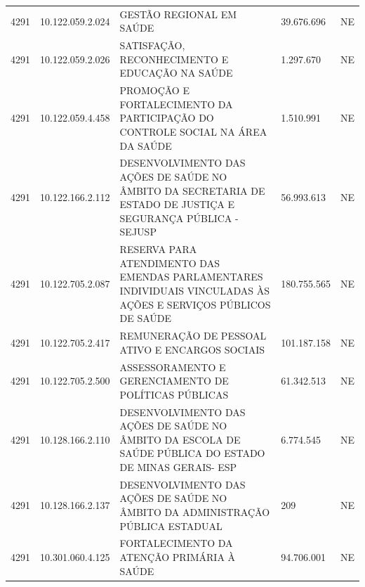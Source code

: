 \documentclass{article}
\begin{document}
\begin{longtable}[c]{m{1cm}|m{2cm}|m{10cm}|m{2cm}|m{1cm}}
\multicolumn{1}{C{1cm}|}{4291} & \multicolumn{1}{C{2cm}|}{10.122.059.2.024} & \multicolumn{1}{L{10cm}|}{GESTÃO REGIONAL EM SAÚDE} & \multicolumn{1}{R{2cm}|}{39.676.696} & \multicolumn{1}{C{1cm}}{NE} \\
\multicolumn{1}{C{1cm}|}{4291} & \multicolumn{1}{C{2cm}|}{10.122.059.2.026} & \multicolumn{1}{L{10cm}|}{SATISFAÇÃO, RECONHECIMENTO E EDUCAÇÃO NA SAÚDE} & \multicolumn{1}{R{2cm}|}{1.297.670} & \multicolumn{1}{C{1cm}}{NE} \\
\multicolumn{1}{C{1cm}|}{4291} & \multicolumn{1}{C{2cm}|}{10.122.059.4.458} & \multicolumn{1}{L{10cm}|}{PROMOÇÃO E FORTALECIMENTO DA PARTICIPAÇÃO DO CONTROLE SOCIAL NA ÁREA DA SAÚDE} & \multicolumn{1}{R{2cm}|}{1.510.991} & \multicolumn{1}{C{1cm}}{NE} \\
\multicolumn{1}{C{1cm}|}{4291} & \multicolumn{1}{C{2cm}|}{10.122.166.2.112} & \multicolumn{1}{L{10cm}|}{DESENVOLVIMENTO DAS AÇÕES DE SAÚDE NO ÂMBITO DA SECRETARIA DE ESTADO DE JUSTIÇA E SEGURANÇA PÚBLICA - SEJUSP} & \multicolumn{1}{R{2cm}|}{56.993.613} & \multicolumn{1}{C{1cm}}{NE} \\
\multicolumn{1}{C{1cm}|}{4291} & \multicolumn{1}{C{2cm}|}{10.122.705.2.087} & \multicolumn{1}{L{10cm}|}{RESERVA PARA ATENDIMENTO DAS EMENDAS PARLAMENTARES INDIVIDUAIS VINCULADAS ÀS AÇÕES E SERVIÇOS PÚBLICOS DE SAÚDE} & \multicolumn{1}{R{2cm}|}{180.755.565} & \multicolumn{1}{C{1cm}}{NE} \\
\multicolumn{1}{C{1cm}|}{4291} & \multicolumn{1}{C{2cm}|}{10.122.705.2.417} & \multicolumn{1}{L{10cm}|}{REMUNERAÇÃO DE PESSOAL ATIVO E ENCARGOS SOCIAIS} & \multicolumn{1}{R{2cm}|}{101.187.158} & \multicolumn{1}{C{1cm}}{NE} \\
\multicolumn{1}{C{1cm}|}{4291} & \multicolumn{1}{C{2cm}|}{10.122.705.2.500} & \multicolumn{1}{L{10cm}|}{ASSESSORAMENTO E GERENCIAMENTO DE POLÍTICAS PÚBLICAS} & \multicolumn{1}{R{2cm}|}{61.342.513} & \multicolumn{1}{C{1cm}}{NE} \\
\multicolumn{1}{C{1cm}|}{4291} & \multicolumn{1}{C{2cm}|}{10.128.166.2.110} & \multicolumn{1}{L{10cm}|}{DESENVOLVIMENTO DAS AÇÕES DE SAÚDE NO ÂMBITO DA ESCOLA DE SAÚDE PÚBLICA DO ESTADO DE MINAS GERAIS- ESP} & \multicolumn{1}{R{2cm}|}{6.774.545} & \multicolumn{1}{C{1cm}}{NE} \\
\multicolumn{1}{C{1cm}|}{4291} & \multicolumn{1}{C{2cm}|}{10.128.166.2.137} & \multicolumn{1}{L{10cm}|}{DESENVOLVIMENTO DAS AÇÕES DE SAÚDE NO ÂMBITO DA ADMINISTRAÇÃO PÚBLICA ESTADUAL} & \multicolumn{1}{R{2cm}|}{209} & \multicolumn{1}{C{1cm}}{NE} \\
\multicolumn{1}{C{1cm}|}{4291} & \multicolumn{1}{C{2cm}|}{10.301.060.4.125} & \multicolumn{1}{L{10cm}|}{FORTALECIMENTO DA ATENÇÃO PRIMÁRIA À SAÚDE} & \multicolumn{1}{R{2cm}|}{94.706.001} & \multicolumn{1}{C{1cm}}{NE} \\

\end{longtable}
\end{document}
